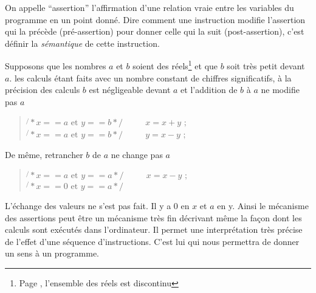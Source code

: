 On appelle ``assertion'' l'affirmation d'une relation vraie entre les
variables du programme en un point donn\'e. Dire comment une instruction modifie
l'assertion qui la pr\'ec\`ede (pr\'e-assertion) pour donner celle qui la suit
(post-assertion), c'est d\'efinir la {\em s\'emantique} de cette instruction.

Supposons que les nombres $a$ et $b$ soient des
r\'eels\footnote{Page \pageref{Variable},
l'ensemble des r\'eels est discontinu}
et que $b$ soit tr\`es petit devant $a$. les calculs \'etant faits avec un
nombre constant de chiffres significatifs, \`a la pr\'ecision des calculs
$b$ est n\'egligeable devant $a$ et l'addition de $b$ \`a $a$ ne modifie pas $a$
\begin{quote}
$\not{ }\ast x == a \mbox{ et } y == b \ast\!\!/ $ \mbox{~~~~} $  x = x + y  \mbox{ ; } $ \\
$\not{ }\ast x == a \mbox{ et } y == b \ast\!\!/ $ \mbox{~~~~} $  y = x - y  \mbox{ ; } $
\end{quote}
De m\^eme, retrancher $b$ de $a$ ne change pas $a$
\begin{quote}
$ \not{ }\ast x == a \mbox{ et } y == a \ast\!\!/ $ \mbox{~~~~} $ x = x - y \mbox{ ; } $ \\
$ \not{ }\ast x == 0 \mbox{ et } y == a \ast\!\!/ $ 
\end {quote} 

L'\'echange des valeurs ne s'est pas fait. Il y a $0$ en $x$ et
$a$ en y. Ainsi le m\'ecanisme des assertions peut \^etre un m\'ecanisme
tr\`es fin d\'ecrivant m\^eme la fa\c con dont les calculs sont ex\'ecut\'es dans
l'ordinateur. Il permet une interpr\'etation tr\`es pr\'ecise de l'effet d'une
s\'equence d'instructions. C'est lui qui nous permettra de donner un sens
\`a un programme.

